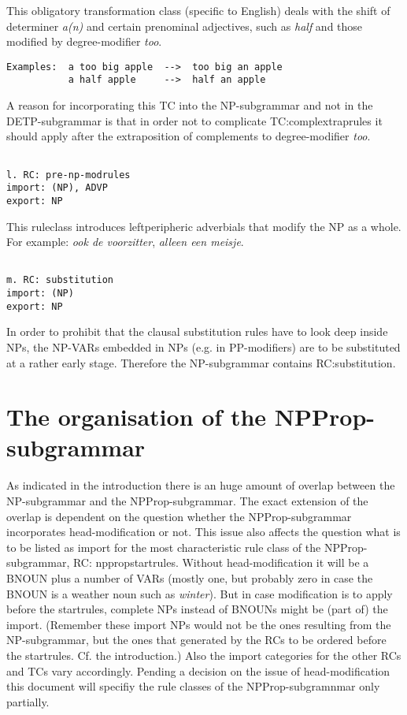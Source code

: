 This obligatory transformation class (specific to English) deals with the shift
of determiner {\em a(n)} and certain prenominal adjectives, such as {\em half}
and those modified by degree-modifier {\em too}. 
\begin{verbatim}
Examples:  a too big apple  -->  too big an apple
           a half apple     -->  half an apple
\end{verbatim}
A reason for incorporating this TC into the NP-subgrammar and not in the
DETP-subgrammar is that in order not to complicate TC:complextraprules it
should apply after the extraposition of complements to degree-modifier {\em
too}. 
\begin{verbatim}

l. RC: pre-np-modrules
import: (NP), ADVP
export: NP
\end{verbatim}
This ruleclass introduces leftperipheric adverbials that modify the NP 
as a whole. For example: {\em ook de voorzitter}, {\em  alleen een meisje}.
\begin{verbatim}

m. RC: substitution
import: (NP)
export: NP
\end{verbatim}
In order to prohibit that the clausal substitution rules have to look 
deep inside NPs, the NP-VARs embedded in NPs (e.g. in PP-modifiers) are to be 
substituted at a rather early stage. Therefore the NP-subgrammar contains 
RC:substitution. 
\section{The organisation of the NPProp-subgrammar}
As indicated in the introduction there is an huge amount of overlap between the
NP-subgrammar and the NPProp-subgrammar. The exact extension of the overlap is
dependent on the question whether the NPProp-subgrammar incorporates
head-modification or not. This issue also affects the question what is to be
listed as import for the most characteristic rule class of the
NPProp-subgrammar, RC: nppropstartrules. Without head-modification it will be a
BNOUN plus a number of VARs (mostly one, but probably zero in case the BNOUN is
a weather noun such as {\em winter}).  But in case modification is to apply
before the startrules, complete NPs instead of BNOUNs might be (part of) the
import. (Remember these import NPs would not be the ones resulting from the
NP-subgrammar, but the ones that generated by the RCs to be ordered before the
startrules. Cf. the introduction.) Also the import categories for the other
RCs and TCs vary accordingly. Pending a decision on the issue of 
head-modification
this
document will specifiy the rule classes of the NPProp-subgramnmar only
partially. 

